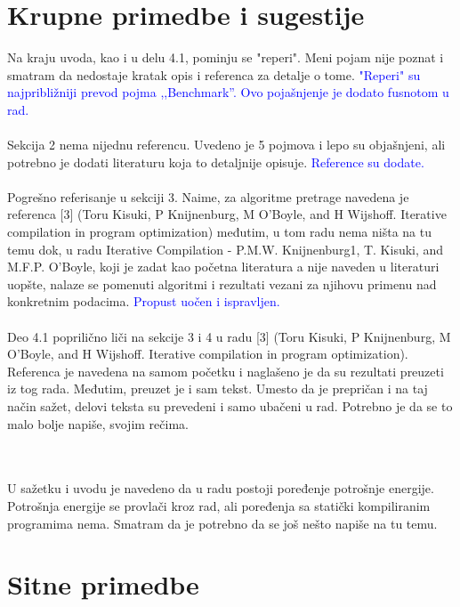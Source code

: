 \documentclass[a4paper]{report}
\newcommand{\odgovor}[1]{\textcolor{blue}{#1}}
\begin{document}
\section{Krupne primedbe i sugestije}

\label{sec: primedbe}

\noindent Na kraju uvoda, kao i u delu 4.1, pominju se "reperi". Meni pojam nije poznat i smatram da nedostaje kratak opis i referenca za detalje o tome.
\odgovor{"Reperi" su najpribližniji prevod pojma ,,Benchmark''. Ovo pojašnjenje je dodato fusnotom u rad. }
\\
\\
Sekcija 2 nema nijednu referencu. Uvedeno je 5 pojmova i lepo su objašnjeni, ali potrebno je dodati literaturu koja to detaljnije opisuje.
\odgovor{Reference su dodate. }
\\
\\
Pogrešno referisanje u sekciji 3. Naime, za algoritme pretrage navedena je referenca [3] (Toru Kisuki, P Knijnenburg, M O'Boyle, and H Wijshoff. Iterative compilation in program optimization) međutim, u tom radu nema ništa na tu temu dok, u radu Iterative Compilation - P.M.W. Knijnenburg1, T. Kisuki, and M.F.P. O'Boyle, koji je zadat kao početna literatura a nije naveden u literaturi uopšte, nalaze se pomenuti algoritmi i rezultati vezani za njihovu primenu nad konkretnim podacima.
\odgovor{Propust uočen i ispravljen.}
\\
\\
Deo 4.1 poprilično liči na sekcije 3 i 4 u radu  [3] (Toru Kisuki, P Knijnenburg, M O'Boyle, and H Wijshoff. Iterative compilation in program optimization). Referenca je navedena na samom početku i naglašeno je da su rezultati preuzeti iz tog rada. Međutim, preuzet je i sam tekst. Umesto da je prepričan i na taj način sažet, delovi teksta su prevedeni i samo ubačeni u rad. Potrebno je da se to malo bolje napiše, svojim rečima.

\\
\\
U sažetku i uvodu je navedeno da u radu postoji poređenje potrošnje energije. Potrošnja energije se provlači kroz rad, ali poređenja sa statički kompiliranim programima nema. Smatram da je potrebno da se još nešto napiše na tu temu.

\section{Sitne primedbe}
\end{document}
